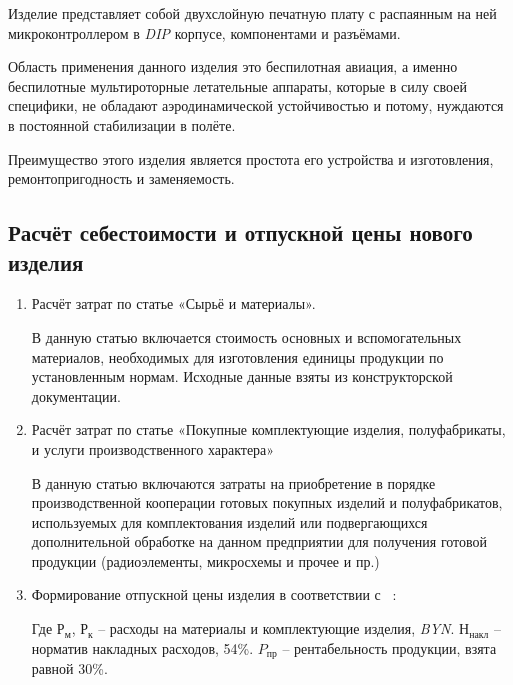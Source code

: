 Изделие представляет собой двухслойную печатную плату с распаянным на
ней микроконтроллером в \textit{DIP} корпусе, компонентами и
разъёмами.

Область применения данного изделия это беспилотная авиация, а именно
беспилотные мультироторные летательные аппараты, которые в силу своей
специфики, не обладают аэродинамической устойчивостью и потому,
нуждаются в постоянной стабилизации в полёте.


Преимущество этого изделия является простота его устройства и
изготовления, ремонтопригодность и заменяемость.

\subsection{Расчёт себестоимости и отпускной цены нового изделия}

\begin{enumerate}
\item Расчёт затрат по статье «Сырьё и материалы».

  В данную статью включается стоимость основных и вспомогательных
  материалов, необходимых для изготовления единицы продукции по
  установленным нормам. Исходные данные взяты из конструкторской
  документации.
  
  

\item Расчёт затрат по статье «Покупные комплектующие изделия,
  полуфабрикаты, и услуги производственного характера»

  В данную статью включаются затраты на приобретение в порядке
  производственной кооперации готовых покупных изделий и полуфабрикатов,
  используемых для комплектования изделий или подвергающихся
  дополнительной обработке на данном предприятии для получения готовой
  продукции (радиоэлементы, микросхемы и прочее и пр.)

  

\item Формирование отпускной цены изделия в соответствии с ~\cite{bsuir-project-economics}:

  

  Где $Р_м$, $Р_к$ – расходы на материалы и комплектующие изделия, \textit{BYN}.
  $Н_{накл}$ – норматив накладных расходов, 54\%.
  $P_{пр}$ – рентабельность продукции, взята равной 30\%.
\end{enumerate}

